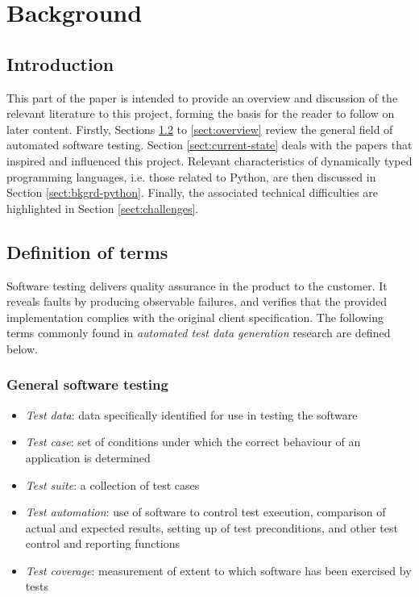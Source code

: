 \documentclass{icldt}
\numberwithin{equation}{section}       %
\begin{document}
	
	
	
	\tableofcontents
	
\chapter{Background}
\label{ch:background}
\section{Introduction}
This part of the paper is intended to provide an overview and discussion of the relevant literature to this project, forming the basis for the reader to follow on later content. Firstly, Sections \ref{sect:basics} to \ref{sect:overview} review the general field of automated software testing. Section \ref{sect:current-state} deals with the papers that inspired and influenced this project. Relevant characteristics of dynamically typed programming languages, i.e. those related to Python, are then discussed in Section \ref{sect:bkgrd-python}. Finally, the associated technical difficulties are highlighted in Section \ref{sect:challenges}.
\section{Definition of terms}
\label{sect:basics}
Software testing delivers quality assurance in the product to the customer. It reveals faults by producing observable failures, and verifies that the provided implementation complies with the original client specification. The following terms commonly found in \emph{automated test data generation} research are defined below.

\subsection{General software testing}
\begin{itemize}
	\item \emph{Test data}: data specifically identified for use in testing the software
	\item \emph{Test case}: set of conditions under which the correct behaviour of an application is determined
	\item \emph{Test suite}: a collection of test cases
	\item \emph{Test automation}: use of software to control test execution, comparison of actual and expected results, setting up of test preconditions, and other test control and reporting functions
	\item \emph{Test coverage}: measurement of extent to which software has been exercised by tests
\end{itemize}
\end{document}
